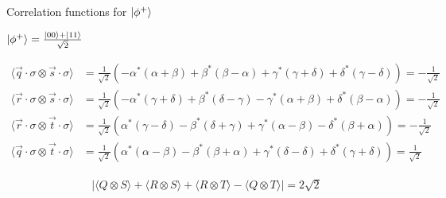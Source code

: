 \documentclass[aspectratio=1610]{beamer}					%
\begin{document}
\begin{frame}{Correlation functions for $\ket{\phi^{+}}$}

$\ket{\phi^{+}} = \frac{\ket{00} + \ket{11}}{\sqrt{2}}$

\begin{align*}
\langle \vec{q}\cdot\sigma\otimes\vec{s}\cdot\sigma\rangle &= \frac{1}{\sqrt{2}}\left(-\alpha^{*}(\alpha+\beta) + \beta^{*}(\beta-\alpha) + \gamma^{*}(\gamma+\delta) + \delta^{*}(\gamma-\delta)\right) = -\frac{1}{\sqrt{2}}\\
\langle \vec{r}\cdot\sigma\otimes\vec{s}\cdot\sigma\rangle &= \frac{1}{\sqrt{2}}\left(-\alpha^{*}(\gamma+\delta) + \beta^{*}(\delta-\gamma) - \gamma^{*}(\alpha + \beta) + \delta^{*}(\beta-\alpha)\right)= -\frac{1}{\sqrt{2}}\\
\langle \vec{r}\cdot\sigma\otimes\vec{t}\cdot\sigma\rangle &= \frac{1}{\sqrt{2}}\left(\alpha^{*}(\gamma-\delta) - \beta^{*}(\delta+\gamma) + \gamma^{*}(\alpha - \beta) - \delta^{*}(\beta+\alpha)\right)= -\frac{1}{\sqrt{2}}\\
\langle \vec{q}\cdot\sigma\otimes\vec{t}\cdot\sigma\rangle &= \frac{1}{\sqrt{2}}\left(\alpha^{*}(\alpha-\beta) - \beta^{*}(\beta+\alpha) + \gamma^{*}(\delta-\delta) + \delta^{*}(\gamma+\delta)\right)= \frac{1}{\sqrt{2}}
\end{align*}

\begin{align*}
|\langle Q\otimes S\rangle + \langle R\otimes S\rangle  + \langle R\otimes T\rangle  - \langle Q\otimes T\rangle|  = 2\sqrt{2}
\end{align*}


\end{frame}
\end{document}
